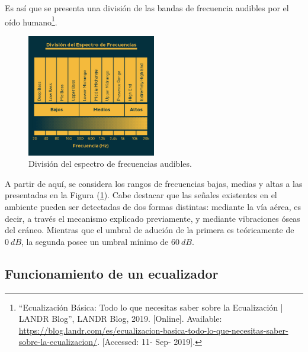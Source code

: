 Es así que se presenta una división de las bandas de frecuencia audibles por el oído humano\footnote{``Ecualización Básica: Todo lo que necesitas saber sobre la Ecualización | LANDR Blog'', LANDR Blog, 2019. [Online]. Available: \url{https://blog.landr.com/es/ecualizacion-basica-todo-lo-que-necesitas-saber-sobre-la-ecualizacion/}. [Accessed: 11- Sep- 2019].}.
\begin{figure}[H]
\centering
	\includegraphics[width=0.5\textwidth]{Imagenes/FrequencySpectrumDivision.png}
	\caption{División del espectro de frecuencias audibles.}
	\label{fig:divfreq}
\end{figure}

A partir de aquí, se considera los rangos de frecuencias bajas, medias y altas a las presentadas en la Figura (\ref{fig:divfreq}). Cabe destacar que las señales existentes en el ambiente pueden ser detectadas de dos formas distintas: mediante la vía aérea, es decir, a través el mecanismo explicado previamente, y mediante vibraciones óseas del cráneo. Mientras que el umbral de adución de la primera es teóricamente de $0 \ dB$, la segunda posee un umbral mínimo de $60 \ dB$. 


\subsection{Funcionamiento de un ecualizador}


